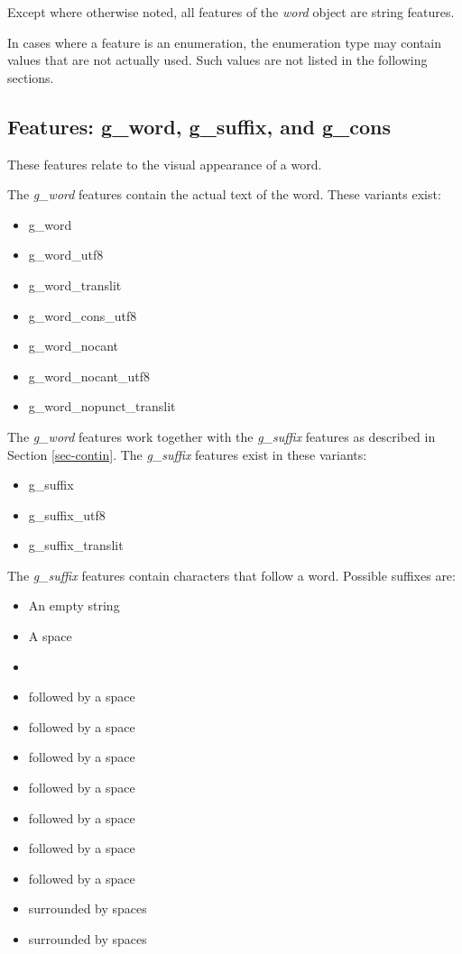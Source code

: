 \documentclass[11pt,oneside,a4paper]{memoir}
\newcommand{\heb}[1]{{\RL {\ezr #1}}}
\begin{document}
Except where otherwise noted, all features of the \emph{word} object are string features.

In cases where a feature is an enumeration, the enumeration type may
contain values that are not actually used. Such values are not listed in the following sections.

\subsection{Features: g\_word, g\_suffix, and g\_cons}\label{suffix}

These features relate to the visual appearance of a word.

The \emph{g\_word} features contain the actual text of the word. These variants exist:

\begin{itemize}
\item g\_word
\item g\_word\_utf8
\item g\_word\_translit
\item g\_word\_cons\_utf8
\item g\_word\_nocant
\item g\_word\_nocant\_utf8
\item g\_word\_nopunct\_translit
\end{itemize}

The \emph{g\_word} features work together with the \emph{g\_suffix} features as
described in Section \ref{sec-contin}. The \emph{g\_suffix} features exist in these variants:

\begin{itemize}
\item g\_suffix
\item g\_suffix\_utf8
\item g\_suffix\_translit
\end{itemize}

The \emph{g\_suffix} features contain characters that follow a word. Possible suffixes are:

\begin{itemize}
\item An empty string
\item A space
\item \heb{־}
\item \heb{׀}\quad followed by a space
\item \heb{׃}\quad followed by a space
\item \heb{׃ ׆}\quad followed by a space
\item \heb{׃ ׆ ס}\quad followed by a space
\item \heb{׃ ׆ פ}\quad followed by a space
\item \heb{׃ ס}\quad followed by a space
\item \heb{׃ פ}\quad followed by a space
\item \heb{ס}\quad surrounded by spaces
\item \heb{פ}\quad surrounded by spaces 
\end{itemize}
\end{document}
